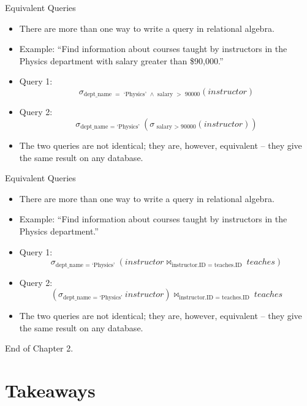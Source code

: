 \documentclass[aspectratio=169]{beamer}
\begin{document}
\begin{frame}{Equivalent Queries}
    \begin{itemize}
        \item There are more than one way to write a query in relational algebra.
        \item Example: ``Find information about courses taught by instructors in the Physics department with salary greater than \$90,000.''
        \item Query 1: 
            $$
                \sigma_{\text{dept\_name } = \text{ `Physics' } \wedge \text{ salary } > \text{ 90000} } (instructor)
            $$
        \item Query 2: 
            $$
                \sigma_{\text{dept\_name } = \text{ `Physics' }} ( \sigma_{ \text{ salary } > \text{ 90000} } (instructor) )
            $$
        \item The two queries are not identical; they are, however, equivalent -- they give the same result on any database.
    \end{itemize}
\end{frame}

\begin{frame}{Equivalent Queries}
    \begin{itemize}
        \item There are more than one way to write a query in relational algebra.
        \item Example: ``Find information about courses taught by instructors in the Physics department.''
        \item Query 1: 
            $$
                \sigma_{\text{dept\_name } = \text{ `Physics' }} (instructor \Join_{\text{instructor.ID } = \text{ teaches.ID }} teaches )
            $$
        \item Query 2: 
            $$
                (\sigma_{\text{dept\_name } = \text{ `Physics' }} instructor) \Join_{\text{instructor.ID } = \text{ teaches.ID }} teaches 
            $$
        \item The two queries are not identical; they are, however, equivalent -- they give the same result on any database.
    \end{itemize}
\end{frame}

\begin{frame}{}
    \centering
    \Huge End of Chapter 2.
\end{frame}

\section*{Takeaways}
\end{document}
